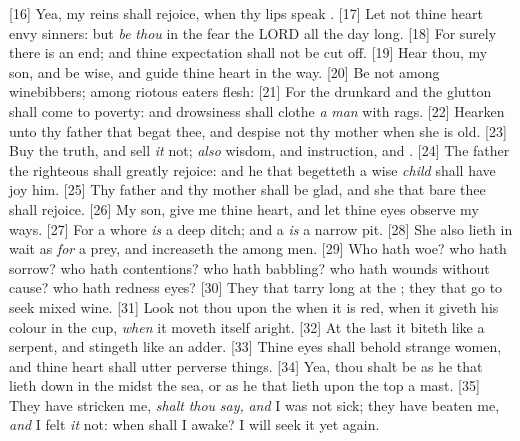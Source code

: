 [16] \textcolor[cmyk]{0.99998,1,0,0}{Yea, my reins shall rejoice, when thy lips speak  .}
[17] \textcolor[cmyk]{0.99998,1,0,0}{Let not thine heart envy sinners: but \emph{be} \emph{thou} in the fear  the LORD all the day long.}
[18] \textcolor[cmyk]{0.99998,1,0,0}{For surely there is an end; and thine expectation shall not be cut off.}
[19] \textcolor[cmyk]{0.99998,1,0,0}{Hear thou, my son, and be wise, and guide thine heart in the way.}
[20] \textcolor[cmyk]{0.99998,1,0,0}{Be not among winebibbers; among riotous eaters  flesh:}
[21] \textcolor[cmyk]{0.99998,1,0,0}{For the drunkard and the glutton shall come to poverty: and drowsiness shall clothe \emph{a} \emph{man} with rags.}
[22] \textcolor[cmyk]{0.99998,1,0,0}{Hearken unto thy father that begat thee, and despise not thy mother when she is old.}
[23] \textcolor[cmyk]{0.99998,1,0,0}{Buy the truth, and sell \emph{it} not; \emph{also} wisdom, and instruction, and  .}
[24] \textcolor[cmyk]{0.99998,1,0,0}{The father  the righteous shall greatly rejoice: and he that begetteth a wise \emph{child} shall have joy  him.}
[25] \textcolor[cmyk]{0.99998,1,0,0}{Thy father and thy mother shall be glad, and she that bare thee shall rejoice.}
[26] \textcolor[cmyk]{0.99998,1,0,0}{My son, give me thine heart, and let thine eyes observe my ways.}
[27] \textcolor[cmyk]{0.99998,1,0,0}{For a whore \emph{is} a deep ditch; and a   \emph{is} a narrow pit.}
[28] \textcolor[cmyk]{0.99998,1,0,0}{She also lieth in wait as \emph{for} a prey, and increaseth the   among men.}
[29] \textcolor[cmyk]{0.99998,1,0,0}{Who hath woe? who hath sorrow? who hath contentions? who hath babbling? who hath wounds without cause? who hath redness  eyes?}
[30] \textcolor[cmyk]{0.99998,1,0,0}{They that tarry long at the  ; they that go to seek mixed wine.}
[31] \textcolor[cmyk]{0.99998,1,0,0}{Look not thou upon the   when it is red, when it giveth his colour in the cup, \emph{when} it moveth itself aright.}
[32] \textcolor[cmyk]{0.99998,1,0,0}{At the last it biteth like a serpent, and stingeth like an adder.}
[33] \textcolor[cmyk]{0.99998,1,0,0}{Thine eyes shall behold strange women, and thine heart shall utter perverse things.}
[34] \textcolor[cmyk]{0.99998,1,0,0}{Yea, thou shalt be as he that lieth down in the midst  the sea, or as he that lieth upon the top  a mast.}
[35] \textcolor[cmyk]{0.99998,1,0,0}{They have stricken me, \emph{shalt} \emph{thou} \emph{say,} \emph{and} I was not sick; they have beaten me, \emph{and} I felt \emph{it} not: when shall I awake? I will seek it yet again.}


